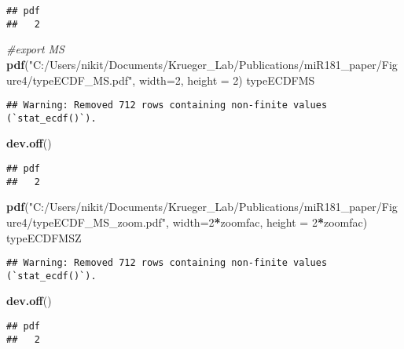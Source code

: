 \documentclass[
]{article}
\newenvironment{Shaded}{\begin{snugshade}}{\end{snugshade}}
\newcommand{\AttributeTok}[1]{\textcolor[rgb]{0.13,0.29,0.53}{#1}}
\newcommand{\CommentTok}[1]{\textcolor[rgb]{0.56,0.35,0.01}{\textit{#1}}}
\newcommand{\DecValTok}[1]{\textcolor[rgb]{0.00,0.00,0.81}{#1}}
\newcommand{\FunctionTok}[1]{\textcolor[rgb]{0.13,0.29,0.53}{\textbf{#1}}}
\newcommand{\NormalTok}[1]{#1}
\newcommand{\SpecialCharTok}[1]{\textcolor[rgb]{0.81,0.36,0.00}{\textbf{#1}}}
\newcommand{\StringTok}[1]{\textcolor[rgb]{0.31,0.60,0.02}{#1}}
\begin{document}
\begin{verbatim}
## pdf 
##   2
\end{verbatim}

\begin{Shaded}
\begin{Highlighting}[]
\CommentTok{\#export MS}
\FunctionTok{pdf}\NormalTok{(}\StringTok{"C:/Users/nikit/Documents/Krueger\_Lab/Publications/miR181\_paper/Figure4/typeECDF\_MS.pdf"}\NormalTok{, }\AttributeTok{width=}\DecValTok{2}\NormalTok{, }\AttributeTok{height =} \DecValTok{2}\NormalTok{)}
\NormalTok{typeECDFMS}
\end{Highlighting}
\end{Shaded}

\begin{verbatim}
## Warning: Removed 712 rows containing non-finite values (`stat_ecdf()`).
\end{verbatim}

\begin{Shaded}
\begin{Highlighting}[]
\FunctionTok{dev.off}\NormalTok{()}
\end{Highlighting}
\end{Shaded}

\begin{verbatim}
## pdf 
##   2
\end{verbatim}

\begin{Shaded}
\begin{Highlighting}[]
\FunctionTok{pdf}\NormalTok{(}\StringTok{"C:/Users/nikit/Documents/Krueger\_Lab/Publications/miR181\_paper/Figure4/typeECDF\_MS\_zoom.pdf"}\NormalTok{, }\AttributeTok{width=}\DecValTok{2}\SpecialCharTok{*}\NormalTok{zoomfac, }\AttributeTok{height =} \DecValTok{2}\SpecialCharTok{*}\NormalTok{zoomfac)}
\NormalTok{typeECDFMSZ}
\end{Highlighting}
\end{Shaded}

\begin{verbatim}
## Warning: Removed 712 rows containing non-finite values (`stat_ecdf()`).
\end{verbatim}

\begin{Shaded}
\begin{Highlighting}[]
\FunctionTok{dev.off}\NormalTok{()}
\end{Highlighting}
\end{Shaded}

\begin{verbatim}
## pdf 
##   2
\end{verbatim}
\end{document}

